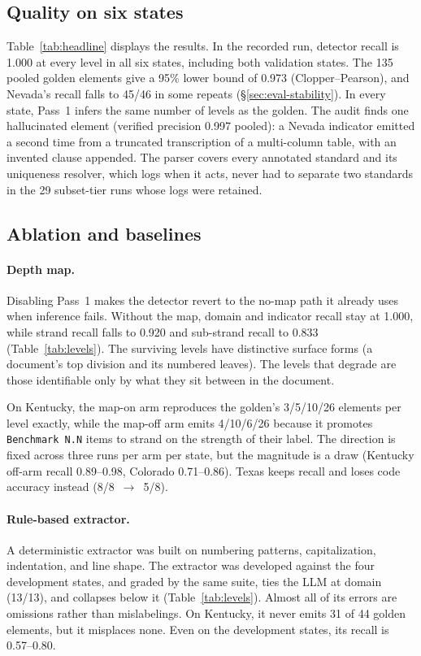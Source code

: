 \documentclass[11pt]{article}
\begin{document}
\subsection{Quality on six states}
\label{sec:eval-headline}

Table~\ref{tab:headline} displays the results. In the recorded run, detector recall is 1.000 at every level in all six states, including both validation states. The 135 pooled golden elements give a 95\% lower bound of 0.973 (Clopper--Pearson), and Nevada's recall falls to 45/46 in some repeats (\S\ref{sec:eval-stability}). In every state, Pass~1 infers the same number of levels as the golden. The audit finds one hallucinated element (verified precision 0.997 pooled): a Nevada indicator emitted a second time from a truncated transcription of a multi-column table, with an invented clause appended. The parser covers every annotated standard and its uniqueness resolver, which logs when it acts, never had to separate two standards in the 29 subset-tier runs whose logs were retained.

\subsection{Ablation and baselines}
\label{sec:eval-ablation}



\paragraph{Depth map.} Disabling Pass~1 makes the detector revert to the no-map path it already uses when inference fails. Without the map, domain and indicator recall stay at 1.000, while strand recall falls to 0.920 and sub-strand recall to 0.833 (Table~\ref{tab:levels}). The surviving levels have distinctive surface forms (a document's top division and its numbered leaves). The levels that degrade are those identifiable only by what they sit between in the document.

On Kentucky, the map-on arm reproduces the golden's 3/5/10/26 elements per level exactly, while the map-off arm emits 4/10/6/26 because it promotes \texttt{Benchmark N.N} items to strand on the strength of their label. The direction is fixed across three runs per arm per state, but the magnitude is a draw (Kentucky off-arm recall 0.89--0.98, Colorado 0.71--0.86). Texas keeps recall and loses code accuracy instead (8/8~$\rightarrow$~5/8).

\paragraph{Rule-based extractor.} A deterministic extractor was built on numbering
patterns, capitalization, indentation, and line shape. The extractor was developed against the
four development states, and graded by the same suite, ties the LLM at domain
(13/13), and collapses below it (Table~\ref{tab:levels}). Almost all of its errors are omissions rather than mislabelings. On Kentucky, it never emits 31 of 44 golden elements, but it misplaces none. Even on the development states, its recall is 0.57--0.80.
\end{document}
